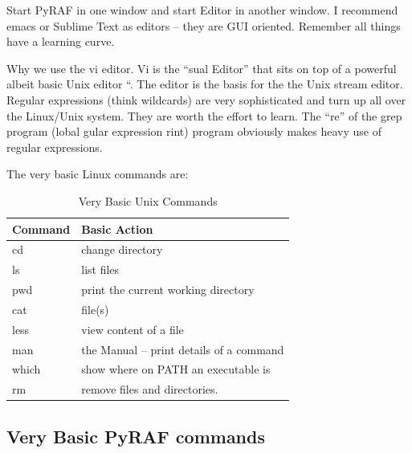 \documentclass[letter,11pt,oneside]{article}
\newcommand{\dhl}[1]{{\color{verbcolor}{\texttt#1}}}
\begin{document}
Start PyRAF in one window and start Editor in another window. I
recommend emacs or Sublime Text as editors -- they are GUI
oriented. Remember all things have a learning curve.

Why we use the vi editor. Vi is the ``\dhl{Vi}sual Editor'' that sits
on top of a powerful albeit basic Unix editor ``\dhl{ed}. The \dhl{ed}
editor is the basis for the \dhl{sed} the Unix stream editor. Regular
expressions (think wildcards) are very sophisticated and turn up all
over the Linux/Unix system. They are worth the effort to learn. The
``re'' of the grep program (\dhl{g}lobal \dhl{re}gular expression
\dhl{p}rint) program obviously makes heavy use of regular expressions.

The very basic Linux commands are:

\begin{table}[h!]
\centering
\begin{tabular}{| l | l |}
\hline
Command  & Basic Action   \\
\hline
cd    & change directory    \\ 
ls    & list files     \\ 
pwd   & print the current working directory    \\ 
cat   & \dhl{concatenate} file(s)    \\ 
less  & view content of a file    \\ 
man   & the Manual -- print details of a command \\ 
which & show where on PATH an executable is \\ 
rm    & remove files and directories. \\
\hline
\end{tabular}
\caption{Very Basic Unix Commands}
\label{table:VeryBasicUnixCommands}
\end{table}


\subsection{Very Basic PyRAF commands}
\end{document}
